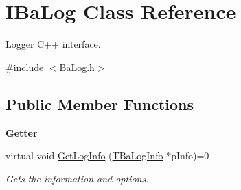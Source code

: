 \hypertarget{classIBaLog}{}\section{I\+Ba\+Log Class Reference}
\label{classIBaLog}


Logger C++ interface.  




{\ttfamily \#include $<$Ba\+Log.\+h$>$}

\subsection*{Public Member Functions}
\begin{Indent}{\bf Getter}\par
\begin{DoxyCompactItemize}
\item 
virtual void \hyperlink{classIBaLog_a9c05a439e0442e4ada9a041390a5f736}{Get\+Log\+Info} (\hyperlink{structTBaLogInfo}{T\+Ba\+Log\+Info} $\ast$p\+Info)=0
\begin{DoxyCompactList}\small\item\em Gets the information and options. \end{DoxyCompactList}\end{DoxyCompactItemize}
\end{Indent}
